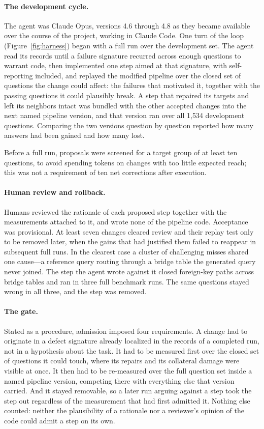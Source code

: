\paragraph{The development cycle.} The agent was Claude Opus, versions 4.6
through 4.8 as they became available over the course of the project, working
in Claude Code.
One turn of the loop (Figure~\ref{fig:harness}) began with a full run over the
development set. The agent
read its records until a failure signature recurred across enough questions to
warrant code, then implemented one step aimed at that signature, with
self-reporting included, and replayed the modified pipeline over the closed set
of questions the change could affect: the failures that motivated it, together
with the passing questions it could plausibly break. A step that repaired its
targets and left its neighbors intact was bundled with the other accepted
changes into the next named pipeline version, and that version ran over all
1,534 development questions. Comparing the two versions question by question
reported how many answers had been gained and how many lost.

Before a full run, proposals were screened for a target group of at least
ten questions, to avoid spending tokens on changes with too little expected
reach; this was not a requirement of ten net corrections after execution.

\paragraph{Human review and rollback.} Humans reviewed the rationale of each
proposed step together with the measurements attached to it, and wrote none of
the pipeline code. Acceptance was provisional. At least seven changes cleared review and
their replay test only to be removed later, when the gains that had justified
them failed to reappear in subsequent full runs. In the clearest case a cluster
of challenging misses shared one cause---a reference query routing through a
bridge table the generated query never joined. The step the agent wrote against
it closed foreign-key paths across bridge tables and ran in three full
benchmark runs. The same questions stayed wrong in all three, and the step was
removed.

\paragraph{The gate.} Stated as a procedure, admission imposed four
requirements. A
change had to originate in a defect signature already localized in the records
of a completed run, not in a hypothesis about the task. It had to be measured
first over the closed set of questions it could touch, where its repairs and
its collateral damage were visible at once. It then had to be re-measured over
the full question set inside a named pipeline version, competing there with
everything else that version carried. And it stayed removable, so a later run
arguing against a step took the step out regardless of the measurement that had
first admitted it. Nothing else counted: neither the plausibility of a
rationale nor a reviewer's opinion of the code could admit a step on its own.
